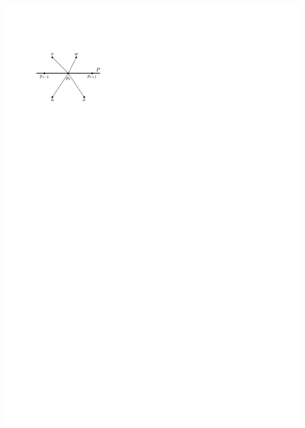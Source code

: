 \documentclass[a4paper]{article}
\begin{document}
\includegraphics[scale=1]{unifiedAlgo/img/rightNeighbourwalk/rotation}
\clearpage%
\end{document}
